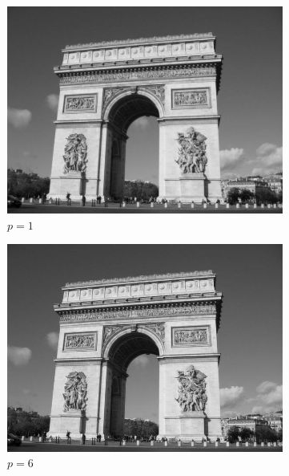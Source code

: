 \documentclass[a4paper,10pt]{report}
\begin{document}
\begin{figure}[h]
 
  \begin{subfigure}{0.32\textwidth}
    \includegraphics[width=0.99\linewidth]{ressource/flouresultat_p1.png} 
    \caption{\(p=1\)}
    \label{fig:p1}
  \end{subfigure}
  \begin{subfigure}{0.32\textwidth}
    \includegraphics[width=0.99\linewidth]{ressource/flouresultat_p6.png} 
    \caption{\(p=6\)}
    \label{fig:p6}
  \end{subfigure}
  \begin{subfigure}{0.32\textwidth}

\end{subfigure}
\end{figure}
\end{document}
